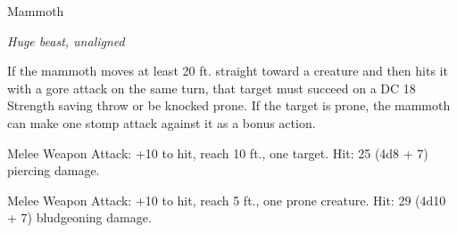 \begin{monsterbox}{Mammoth}
\begin{hangingpar}
\textit{Huge beast, unaligned}
\end{hangingpar}
\dndline%
\basics[%
armorclass = 13,
hitpoints = 11d12 + 55,
speed = {40 ft.}
]
\dndline%
\stats[%
STR = \stat{24},
DEX = \stat{9},
CON = \stat{21},
INT = \stat{3},
WIS = \stat{11},
CHA = \stat{6}
]
\dndline%
\details[%
skills={},
damageimmunities={},
savingthrows={},
conditionimmunities={},
damageresistances={},
damagevulnerabilities={},
senses={passive Perception 10},
challenge=6
]
\dndline%
\begin{monsteraction}
If the mammoth moves at least 20 ft. straight toward a creature and then hits it with a gore attack on the same turn, that target must succeed on a DC 18 Strength saving throw or be knocked prone. If the target is prone, the mammoth can make one stomp attack against it as a bonus action.
\end{monsteraction}
\begin{monsteraction}[Gore]
Melee Weapon Attack: +10 to hit, reach 10 ft., one target. Hit: 25 (4d8 + 7) piercing damage.
\end{monsteraction}
\begin{monsteraction}[Stomp]
Melee Weapon Attack: +10 to hit, reach 5 ft., one prone creature. Hit: 29 (4d10 + 7) bludgeoning damage.
\end{monsteraction}
\end{monsterbox}